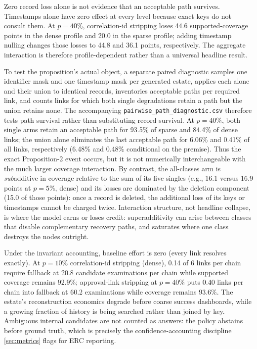 \begin{finding}
\label{fnd:superadd}
Zero record loss alone is not evidence that an acceptable path survives.
Timestamps alone have zero effect at every level because exact keys do not consult
them. At $p{=}40\%$, correlation-id stripping loses 44.6 supported-coverage points
in the dense profile and 20.0 in the sparse profile; adding timestamp nulling changes
those losses to 44.8 and 36.1 points, respectively. The aggregate interaction is
therefore profile-dependent rather than a universal headline result.

To test the proposition's actual object, a separate paired diagnostic samples one
identifier mask and one timestamp mask per generated estate, applies each alone
and their union to identical records, inventories acceptable paths per required
link, and counts links for which both single degradations retain a path but the
union retains none. The accompanying \texttt{pairwise\_path\_diagnostic.csv} therefore
tests path survival rather than substituting record survival. At $p{=}40\%$, both
single arms retain an acceptable path for 93.5\% of sparse and 84.4\% of dense
links; the union alone eliminates the last acceptable path for 6.06\% and 0.41\%
of all links, respectively (6.48\% and 0.48\% conditional on the premise). Thus
the exact Proposition-2 event occurs, but it is not numerically interchangeable
with the much larger coverage interaction. By contrast, the all-classes arm is
\emph{sub}additive in coverage relative to the sum of its five singles (e.g.,
16.1 versus 16.9 points at $p{=}5\%$, dense) and its losses are dominated by
the deletion component (15.0 of those points): once a record is deleted, the
additional loss of its keys or timestamps cannot be charged twice. Interaction
structure, not headline collapse, is where the model earns or loses credit:
superadditivity can arise between classes that disable complementary recovery
paths, and saturates where one class destroys the nodes outright.
\end{finding}

\begin{finding}
\label{fnd:effort}
Under the invariant accounting, baseline effort is zero (every link resolves
exactly). At $p{=}10\%$ correlation-id stripping (dense), 0.14 of 6 links per
chain require fallback at 20.8 candidate examinations per chain while supported
coverage remains 92.9\%; approval-link stripping at $p{=}40\%$ puts 0.40 links per
chain into fallback at 60.2 examinations while coverage remains 93.6\%.
The estate's reconstruction economics degrade before coarse success dashboards,
while a growing fraction of history is being searched rather than joined by key.
Ambiguous internal candidates are not counted as answers: the policy abstains
before ground truth, which is precisely the confidence-accounting discipline
\cref{sec:metrics} flags for ERC reporting.
\end{finding}

